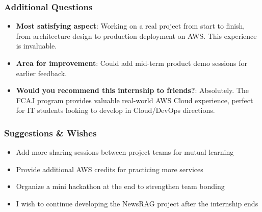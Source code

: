 \hypertarget{additional-questions}{%
\subsubsection{Additional Questions}}

\begin{itemize}
\tightlist
\item
  \textbf{Most satisfying aspect}: Working on a real project from start
  to finish, from architecture design to production deployment on AWS.
  This experience is invaluable.
\item
  \textbf{Area for improvement}: Could add mid-term product demo
  sessions for earlier feedback.
\item
  \textbf{Would you recommend this internship to friends?}: Absolutely.
  The FCAJ program provides valuable real-world AWS Cloud experience,
  perfect for IT students looking to develop in Cloud/DevOps directions.
\end{itemize}

\hypertarget{suggestions-wishes}{%
\subsubsection{Suggestions \& Wishes}}

\begin{itemize}
\tightlist
\item
  Add more sharing sessions between project teams for mutual learning
\item
  Provide additional AWS credits for practicing more services
\item
  Organize a mini hackathon at the end to strengthen team bonding
\item
  I wish to continue developing the NewsRAG project after the internship
  ends
\end{itemize}
